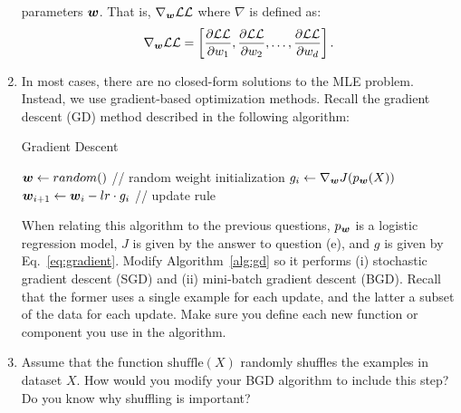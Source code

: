 \documentclass[11pt,a4paper]{article}
\begin{document}
\begin{enumerate}[label=(\alph*)]
          parameters ${\boldsymbol{w}}$.
          That is, $\nabla_{{\boldsymbol{w}}}\mathcal{LL}$ where $\nabla$ is defined as:
          \begin{align}\label{eq:gradient}
              \nabla_{{\boldsymbol{w}}}\mathcal{LL} = \left[\frac{\partial\mathcal{LL}}{\partial w_1},
                  \frac{\partial\mathcal{LL}}{\partial w_2}, \ldots, \frac{\partial\mathcal{LL}}{\partial w_d}\right].
          \end{align}
    \item In most cases, there are no closed-form solutions to the MLE problem.
          Instead, we use gradient-based optimization methods.
          Recall the gradient descent (GD) method described in the following
          algorithm:
          \begin{algorithm}
              \caption{Gradient Descent}
              \label{alg:gd}
              \begin{algorithmic}[1]
                  \State ${\boldsymbol{w}}\leftarrow random()$ \qquad   // random weight initialization
                  \State $g_i\leftarrow \nabla_{{\boldsymbol{w}}}J(p_{{\boldsymbol{w}}}(X))$
                  \State ${\boldsymbol{w}}_{i+1}\leftarrow {\boldsymbol{w}}_i - lr \cdot g_i$ \qquad   // update rule
                  \EndFor
                  \EndProcedure
              \end{algorithmic}
          \end{algorithm}

          When relating this algorithm to the previous questions, $p_{{\boldsymbol{w}}}$ is a
          logistic regression model, $J$ is given by the answer to question (e),
          and $g$ is given by Eq.~\ref{eq:gradient}.
          Modify Algorithm~\ref{alg:gd} so it performs (i) stochastic gradient
          descent (SGD) and (ii) mini-batch gradient descent (BGD).
          Recall that the former uses a single example for each update, and the
          latter a subset of the data for each update.
          Make sure you define each new function or component you use in the
          algorithm.
    \item Assume that the function $\text{shuffle}(X)$ randomly shuffles the
          examples in dataset $X$.
          How would you modify your BGD algorithm to include this step?
          Do you know why shuffling is important?
\end{enumerate}
\end{document}
